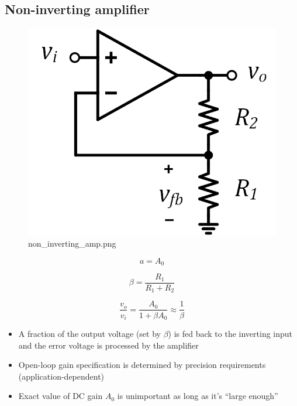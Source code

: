 \documentclass[11pt]{article}
\providecommand{\tightlist}{%
      \setlength{\itemsep}{0pt}\setlength{\parskip}{0pt}}
\begin{document}
    \hypertarget{non-inverting-amplifier}{%
\subsection{Non-inverting amplifier}\label{non-inverting-amplifier}}

    \begin{figure}
\centering
\includegraphics{non_inverting_amp.png}
\caption{non\_inverting\_amp.png}
\end{figure}

    \begin{equation}
a = A_{0}
\end{equation}

\begin{equation}
\beta = \dfrac{R_1}{R_1 + R_2}
\end{equation}

\begin{equation}
\dfrac{v_o}{v_i} = \dfrac{A_{0}}{1+\beta A_{0}} \approx \dfrac{1}{\beta}
\end{equation}

    \begin{itemize}
\tightlist
\item
  A fraction of the output voltage (set by \(\beta\)) is fed back to the
  inverting input and the error voltage is processed by the amplifier
\item
  Open-loop gain specification is determined by precision requirements
  (application-dependent)
\item
  Exact value of DC gain \(A_0\) is unimportant as long as it's ``large
  enough''
\end{itemize}
\end{document}
